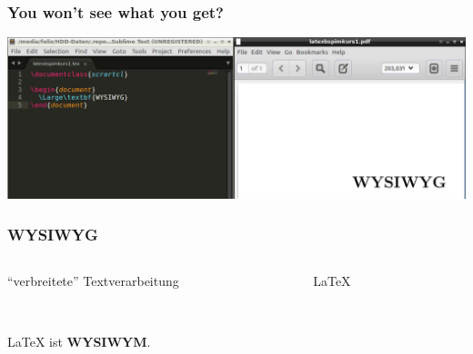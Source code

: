 \begin{frame}
  \frametitle{You won't see what you get?}
  \includegraphics[width=\textwidth]{pics/wysiwyg2.png}
\end{frame}
\begin{frame}\frametitle{WYSIWYG}
  \begin{columns}
    \begin{column}{0.4\textwidth}
      \centering
      {\Large \enquote{verbreitete} Textverarbeitung}\\
      \ \\
    \end{column}
    \begin{column}{0.6\textwidth}
      \centering
      {\Large\LaTeX{}}\\
      \ \\
    \end{column}
  \end{columns}

  \bigskip
  

  \Large

  \LaTeX{} ist \textbf{WYSIWYM}.
  
\end{frame}

